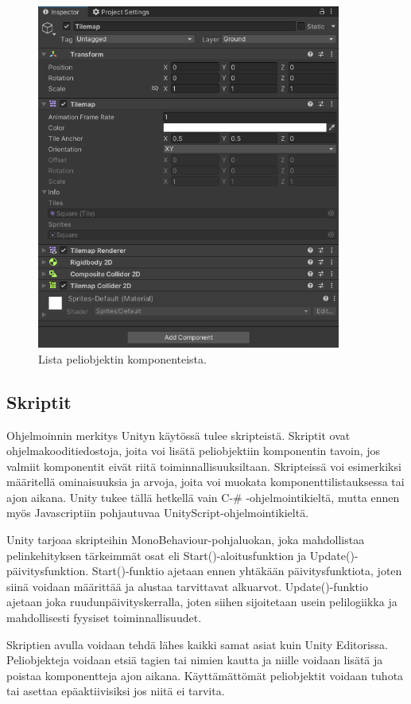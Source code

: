 \documentclass[utf8]{gradu3}
\begin{document}
\begin{figure}[t]
\centering
\includegraphics[width=10cm]{komponenttilistaus.png}
\caption{Lista peliobjektin komponenteista.}
\label{komponenttikuva}
\end{figure}

\subsection{Skriptit}

Ohjelmoinnin merkitys Unityn käytössä tulee skripteistä. Skriptit ovat ohjelmakooditiedostoja, joita voi lisätä peliobjektiin komponentin tavoin, jos valmiit komponentit eivät riitä toiminnallisuuksiltaan. Skripteissä voi esimerkiksi määritellä ominaisuuksia ja arvoja, joita voi muokata komponenttilistauksessa tai ajon aikana. Unity tukee tällä hetkellä vain C-\# -ohjelmointikieltä, mutta ennen myös Javascriptiin pohjautuvaa UnityScript-ohjelmointikieltä.

Unity tarjoaa skripteihin MonoBehaviour-pohjaluokan, joka mahdollistaa pelinkehityksen tärkeimmät osat eli Start()-aloitusfunktion ja Update()-päivitysfunktion. Start()-funktio ajetaan ennen yhtäkään päivitysfunktiota, joten siinä voidaan määrittää ja alustaa tarvittavat alkuarvot. Update()-funktio ajetaan joka ruudunpäivityskerralla, joten siihen sijoitetaan usein pelilogiikka ja mahdollisesti fyysiset toiminnallisuudet.

Skriptien avulla voidaan tehdä lähes kaikki samat asiat kuin Unity Editorissa. Peliobjekteja voidaan etsiä tagien tai nimien kautta ja niille voidaan lisätä ja poistaa komponentteja ajon aikana. Käyttämättömät peliobjektit voidaan tuhota tai asettaa epäaktiivisiksi jos niitä ei tarvita.
\end{document}
